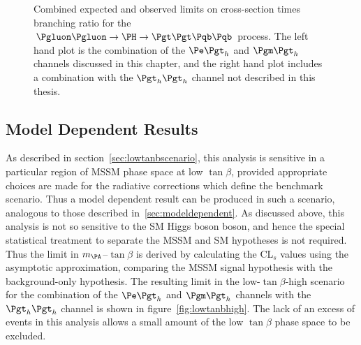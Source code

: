 \begin{figure}
\begin{center}

\end{center}
\caption[Combined expected and observed limits on cross-section times branching ratio for the
$\Pgluon\Pgluon\to\PH\to\Pgt\Pgt\Pqb\Pqb$ process.]{
Combined expected and observed limits on cross-section times branching ratio for the
$\Pgluon\Pgluon\to\PH\to\Pgt\Pgt\Pqb\Pqb$ process. The left hand plot is the
combination of the $\etau$ and $\mutau$ channels discussed in this chapter, and
the right hand plot includes a combination with the $\tautau$ channel not
described in this thesis.}
\label{fig:HhhCmblimits}
\end{figure}

\subsection{Model Dependent Results}

As described in section~\ref{sec:lowtanbscenario}, this analysis is sensitive in
a particular region of \ac{MSSM} phase space at low $\tan\beta$, provided
appropriate choices are made for the radiative corrections which define the
benchmark scenario. Thus a model dependent result can be produced in such a
scenario, analogous to those described in~\ref{sec:modeldependent}. As discussed
above, this analysis is not so sensitive to the \ac{SM} Higgs boson boson, and hence
the special statistical treatment to separate the \ac{MSSM} and \ac{SM}
hypotheses is not required. Thus the limit in $m_{\PA}$--$\tan\beta$ is derived
by calculating the CL$_{s}$ values using the asymptotic approximation, comparing
the \ac{MSSM} signal hypothesis with the background-only hypothesis. The
resulting limit in the low-$\tan\beta$-high scenario for the combination of the
$\etau$ and $\mutau$ channels with the $\tautau$ channel is shown in
figure~\ref{fig:lowtanbhigh}. The lack of an excess of events in this analysis
allows a small amount of the low $\tan\beta$ phase space to be excluded.

